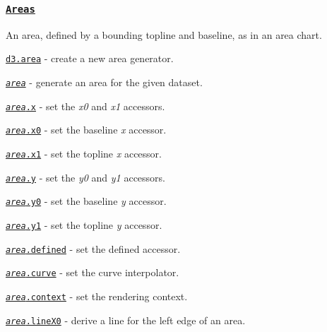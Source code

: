 \subsubsection*{\href{https://github.com/d3/d3-shape/blob/master/README.md#areas}{\tt Areas}}

An area, defined by a bounding topline and baseline, as in an area chart.


\begin{DoxyItemize}
\item \href{https://github.com/d3/d3-shape/blob/master/README.md#area}{\tt d3.\+area} -\/ create a new area generator.
\item \href{https://github.com/d3/d3-shape/blob/master/README.md#_area}{\tt {\itshape area}} -\/ generate an area for the given dataset.
\item \href{https://github.com/d3/d3-shape/blob/master/README.md#area_x}{\tt {\itshape area}.x} -\/ set the {\itshape x0} and {\itshape x1} accessors.
\item \href{https://github.com/d3/d3-shape/blob/master/README.md#area_x0}{\tt {\itshape area}.x0} -\/ set the baseline {\itshape x} accessor.
\item \href{https://github.com/d3/d3-shape/blob/master/README.md#area_x1}{\tt {\itshape area}.x1} -\/ set the topline {\itshape x} accessor.
\item \href{https://github.com/d3/d3-shape/blob/master/README.md#area_y}{\tt {\itshape area}.y} -\/ set the {\itshape y0} and {\itshape y1} accessors.
\item \href{https://github.com/d3/d3-shape/blob/master/README.md#area_y0}{\tt {\itshape area}.y0} -\/ set the baseline {\itshape y} accessor.
\item \href{https://github.com/d3/d3-shape/blob/master/README.md#area_y1}{\tt {\itshape area}.y1} -\/ set the topline {\itshape y} accessor.
\item \href{https://github.com/d3/d3-shape/blob/master/README.md#area_defined}{\tt {\itshape area}.defined} -\/ set the defined accessor.
\item \href{https://github.com/d3/d3-shape/blob/master/README.md#area_curve}{\tt {\itshape area}.curve} -\/ set the curve interpolator.
\item \href{https://github.com/d3/d3-shape/blob/master/README.md#area_context}{\tt {\itshape area}.context} -\/ set the rendering context.
\item \href{https://github.com/d3/d3-shape/blob/master/README.md#area_lineX0}{\tt {\itshape area}.line\+X0} -\/ derive a line for the left edge of an area.

\end{DoxyItemize}
